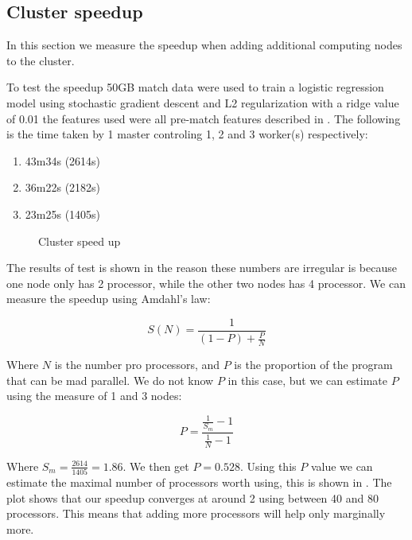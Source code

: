 \subsection{Cluster speedup}\label{sec:speedup}
In this section we measure the speedup when adding additional computing nodes to the cluster.

To test the speedup 50GB match data were used to train a logistic regression model using stochastic gradient descent and L2 regularization with a ridge value of 0.01 the features used were all pre-match features described in  . The following is the time taken by 1 master controling 1, 2 and 3 worker(s) respectively:

\begin{enumerate}
    \item 43m34s (2614s)
    \item 36m22s (2182s)
    \item 23m25s (1405s)
\end{enumerate}


\begin{figure}[!htb]
  \centering
   \caption{Cluster speed up}\label{fig:cluster-speedup}
\end{figure}
The results of test is shown in  the reason these numbers are irregular is because one node only has 2 processor, while the other two nodes has 4 processor. We can measure the speedup using Amdahl's law:

\[S(N) = \frac{1}{(1-P)+\frac{P}{N}}\]

Where $N$ is the number pro processors, and $P$ is the proportion of the program that can be mad parallel. We do not know $P$ in this case, but we can estimate $P$ using the measure of 1 and 3 nodes:

\[P = \frac{\frac{1}{S_m}-1}{\frac{1}{N}-1}  \]

Where \( S_m=\frac{2614}{1405} = 1.86 \). We then get $P = 0.528$. Using this $P$ value we can estimate the maximal number of processors worth using, this is shown in . The plot shows that our speedup converges at around 2 using between 40 and 80 processors. This means that adding more processors will help only marginally more.


